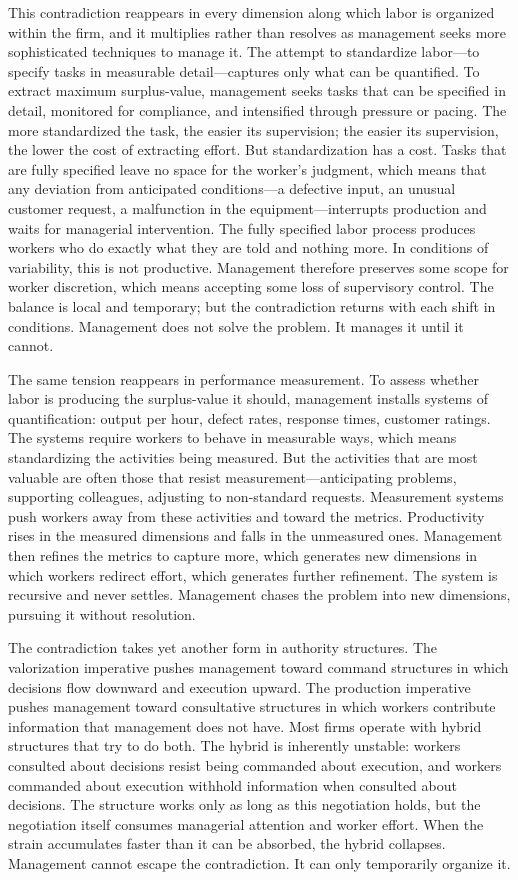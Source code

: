 This contradiction reappears in every dimension along which labor is organized within the firm, and it multiplies rather than resolves as management seeks more sophisticated techniques to manage it. The attempt to standardize labor—to specify tasks in measurable detail—captures only what can be quantified. To extract maximum surplus-value, management seeks tasks that can be specified in detail, monitored for compliance, and intensified through pressure or pacing. The more standardized the task, the easier its supervision; the easier its supervision, the lower the cost of extracting effort. But standardization has a cost. Tasks that are fully specified leave no space for the worker's judgment, which means that any deviation from anticipated conditions—a defective input, an unusual customer request, a malfunction in the equipment—interrupts production and waits for managerial intervention. The fully specified labor process produces workers who do exactly what they are told and nothing more. In conditions of variability, this is not productive. Management therefore preserves some scope for worker discretion, which means accepting some loss of supervisory control. The balance is local and temporary; but the contradiction returns with each shift in conditions. Management does not solve the problem. It manages it until it cannot.

The same tension reappears in performance measurement. To assess whether labor is producing the surplus-value it should, management installs systems of quantification: output per hour, defect rates, response times, customer ratings. The systems require workers to behave in measurable ways, which means standardizing the activities being measured. But the activities that are most valuable are often those that resist measurement—anticipating problems, supporting colleagues, adjusting to non-standard requests. Measurement systems push workers away from these activities and toward the metrics. Productivity rises in the measured dimensions and falls in the unmeasured ones. Management then refines the metrics to capture more, which generates new dimensions in which workers redirect effort, which generates further refinement. The system is recursive and never settles. Management chases the problem into new dimensions, pursuing it without resolution.

The contradiction takes yet another form in authority structures. The valorization imperative pushes management toward command structures in which decisions flow downward and execution upward. The production imperative pushes management toward consultative structures in which workers contribute information that management does not have. Most firms operate with hybrid structures that try to do both. The hybrid is inherently unstable: workers consulted about decisions resist being commanded about execution, and workers commanded about execution withhold information when consulted about decisions. The structure works only as long as this negotiation holds, but the negotiation itself consumes managerial attention and worker effort. When the strain accumulates faster than it can be absorbed, the hybrid collapses. Management cannot escape the contradiction. It can only temporarily organize it.

